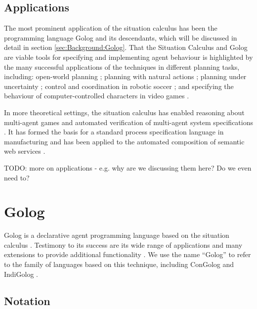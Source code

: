 \subsection{Applications}

The most prominent application of the situation calculus has been
the programming language Golog \citep{levesque97golog} and its descendants,
which will be discussed in detail in section \ref{sec:Background:Golog}.
That the Situation Calculus and Golog are viable tools for specifying
and implementing agent behaviour is highlighted by the many successful
applications of the techniques in different planning tasks, including:
open-world planning \citep{Finzi00open_world_sitcalc}; planning with
natural actions \citep{pirri00planning_nat_acts}; planning under
uncertainty \citep{baier03golog_planning}; control and coordination
in robotic soccer \citep{Ferrein2005readylog}; and specifying the
behaviour of computer-controlled characters in video games \citep{jacobs05unrealgolog}.

In more theoretical settings, the situation calculus has enabled reasoning
about multi-agent games \citep{delgrande01sitcalc_cleudo} and automated
verification of multi-agent system specifications \citep{shapiro02casl,lesperance05ecasl}.
It has formed the basis for a standard process specification language
in manufacturing \citep{gruninger04psl} and has been applied to the
automated composition of semantic web services \citep{mcilraith02golog_web_services}.

TODO: more on applications - e.g. why are we discussing them here?
Do we even need to?

\newpage{}


\section{Golog\label{sec:Background:Golog}}

Golog is a declarative agent programming language based on the situation
calculus \citep{levesque97golog}. Testimony to its success are its
wide range of applications and many extensions to provide additional
functionality \citep{giacomo00congolog,giacomo99indigolog,Ferrein2005readylog}.
We use the name {}``Golog'' to refer to the family of languages
based on this technique, including ConGolog \citep{giacomo00congolog}
and IndiGolog \citep{giacomo99indigolog}.


\subsection{Notation}

